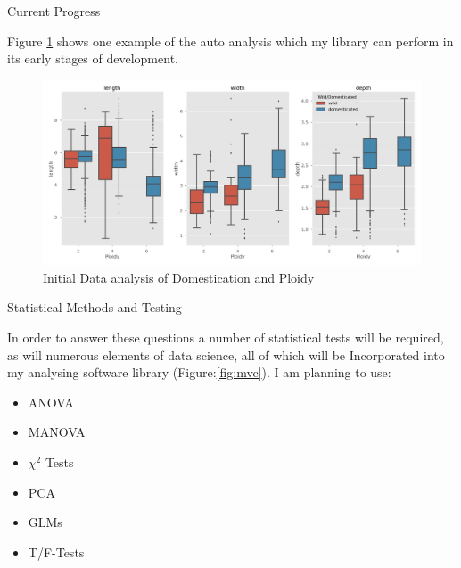 \documentclass[final]{beamer}
\begin{document}
\begin{frame}{}
\begin{textblock}{27.7}
\begin{block}{Current Progress}
\begin{multicols}{2}
      \end{multicols}

      \vspace{0.3cm}

      Figure \ref{fig:initalboxplots} shows one example of the auto analysis which my library
      can perform in its early stages of development.
      
      \begin{figure}[htb]
        \centering
        \includegraphics[width=22cm]{domesticated.png}
        \caption{\label{fig:initalboxplots}Initial Data analysis of Domestication and Ploidy}
      \end{figure}
      
    \end{block}

    
    \begin{block}{Statistical Methods and Testing}

      In order to answer these questions a number of statistical tests will be required,
      as will numerous elements of data science, all of which will be Incorporated into
      my analysing software library (Figure:\ref{fig:mvc}). I am planning to use:

      \begin{multicols}{2}

        \begin{itemize}
        \item ANOVA
        \item MANOVA
        \item $\chi^2$ Tests
        \end{itemize}

        \columnbreak

        \begin{itemize}
        \item PCA
        \item GLMs
        \item T/F-Tests
        \end{itemize}


\end{multicols}
\end{block}
\end{textblock}
\end{frame}
\end{document}
